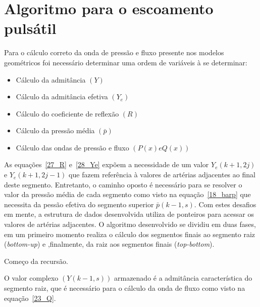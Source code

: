 \documentclass[
        english,			
        brazil			        %
        ,<...>]{abntbibufjf}
\begin{document}
\section{Algoritmo para o escoamento pulsátil}
\label{sec:algoritmo}

Para o cálculo correto da onda de pressão e fluxo presente nos modelos geométricos foi necessário determinar uma ordem de variáveis à se determinar:

\begin{itemize}
    \item Cálculo da admitância $(Y)$
    \item Cálculo da admitância efetiva $(Y_e)$
    \item Cálculo do coeficiente de reflexão $(R)$
    \item Cálculo da pressão média $(\bar{p})$
    \item Cálculo das ondas de pressão e fluxo $(P(x) e Q(x))$
\end{itemize}

As equações~\eqref{27_R} e~\eqref{28_Ye} expõem a necessidade de um valor $Y_e(k+1,2j)$ e $Y_e(k+1,2j-1)$ que fazem referência à valores de artérias adjacentes ao final deste segmento.
Entretanto, o caminho oposto é necessário para se resolver o valor da pressão média de cada segmento como visto na equação~\eqref{18_barp} que necessita da pessão efetiva do segmento superior $\bar{p}(k-1,s)$.
Com estes desafios em mente, a estrutura de dados desenvolvida utiliza de ponteiros para acessar os valores de artérias adjacentes. O algoritmo desenvolvido se dividiu em duas fases, em um primeiro momento realiza o cálculo dos segmentos finais ao segmento raiz (\textit{bottom-up}) e ,finalmente, da raiz aos segmentos finais (\textit{top-bottom}).


\begin{algorithm}[H]
	\SetAlgoLined
\caption{Começo da recursão.}
\end{algorithm}

O valor complexo $(Y(k-1,s))$ armazenado é a admitância característica do segmento raiz, que é necessário para o cálculo da onda de fluxo como visto na equação~\eqref{23_Q}.
\end{document}
